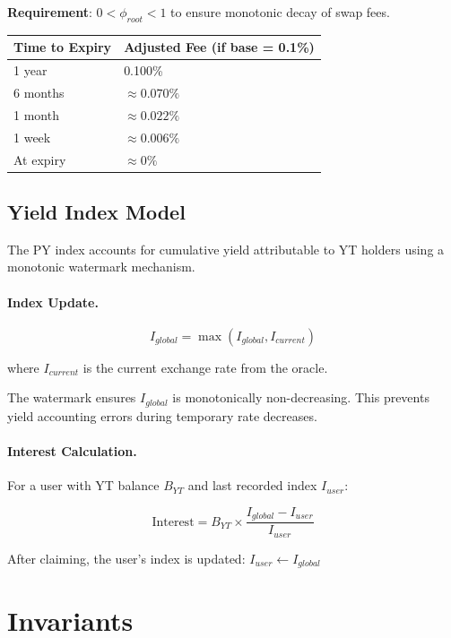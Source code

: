 \textbf{Requirement}: $0 < \phi_{root} < 1$ to ensure monotonic decay of swap fees.

\begin{center}
\begin{tabular}{ll}
\toprule
\textbf{Time to Expiry} & \textbf{Adjusted Fee (if base = 0.1\%)} \\
\midrule
1 year & 0.100\% \\
6 months & $\approx 0.070\%$ \\
1 month & $\approx 0.022\%$ \\
1 week & $\approx 0.006\%$ \\
At expiry & $\approx 0\%$ \\
\bottomrule
\end{tabular}
\end{center}

\subsection{Yield Index Model}

The PY index accounts for cumulative yield attributable to YT holders using a monotonic watermark mechanism.

\paragraph{Index Update.}

\[
I_{global} = \max(I_{global}, I_{current})
\]

where $I_{current}$ is the current exchange rate from the oracle.

The watermark ensures $I_{global}$ is monotonically non-decreasing. This prevents yield accounting errors during temporary rate decreases.

\paragraph{Interest Calculation.}

For a user with YT balance $B_{YT}$ and last recorded index $I_{user}$:

\[
\text{Interest} = B_{YT} \times \frac{I_{global} - I_{user}}{I_{user}}
\]

After claiming, the user's index is updated: $I_{user} \leftarrow I_{global}$

\section{Invariants}

